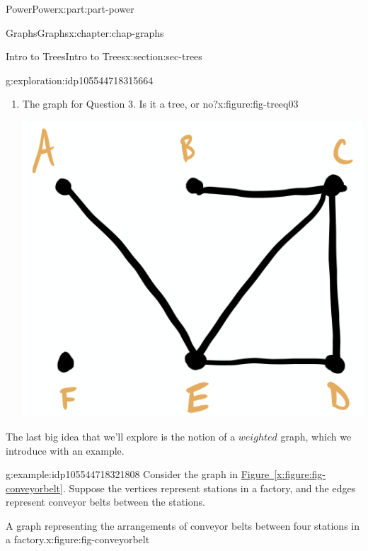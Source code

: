 \documentclass[oneside,10pt,]{book}
\newcommand{\xreffont}{\relax}
\numberwithin{equation}{section}
\begin{document}
\begin{partptx}{Power}{}{Power}{}{}{x:part:part-power}
\begin{chapterptx}{Graphs}{}{Graphs}{}{}{x:chapter:chap-graphs}
\begin{sectionptx}{Intro to Trees}{}{Intro to Trees}{}{}{x:section:sec-trees}
\begin{exploration}{}{g:exploration:idp105544718315664}
\begin{enumerate}
\begin{figureptx}{The graph for Question 2. Is it a tree, or no?}{x:figure:fig-treeq02}{}
\begin{image}{0.25}{0.5}{0.25}
\end{image}%
\tcblower
\end{figureptx}%
%
\item{}\begin{figureptx}{The graph for Question 3. Is it a tree, or no?}{x:figure:fig-treeq03}{}%
\begin{image}{0.25}{0.5}{0.25}%
\includegraphics[width=\linewidth]{images/tree03.png}
\end{image}%
\tcblower
\end{figureptx}%
%
\end{enumerate}
\end{exploration}%
The last big idea that we'll explore is the notion of a \(weighted\) graph, which we introduce with an example.%
\begin{example}{}{g:example:idp105544718321808}%
Consider the graph in \hyperref[x:figure:fig-conveyorbelt]{Figure~{\xreffont\ref{x:figure:fig-conveyorbelt}}}. Suppose the vertices represent stations in a factory, and the edges represent conveyor belts between the stations.%
\begin{figureptx}{A graph representing the arrangements of conveyor belts between four stations in a factory.}{x:figure:fig-conveyorbelt}{}%
\begin{image}{0.25}{0.5}{0.25}%

\end{image}
\end{figureptx}
\end{example}
\end{sectionptx}
\end{chapterptx}
\end{partptx}
\end{document}
